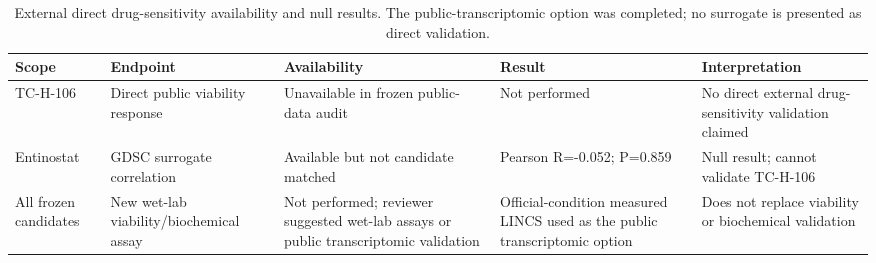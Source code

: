 \begingroup
\footnotesize
\begin{table}[H]
\centering
\caption{External direct drug-sensitivity availability and null results. The public-transcriptomic option was completed; no surrogate is presented as direct validation.}
\label{tab:s_external}
\begin{tabular}{@{}p{}p{}p{}p{}p{}@{}}
\toprule
Scope & Endpoint & Availability & Result & Interpretation \\
\midrule
TC-H-106 & Direct public viability response & Unavailable in frozen public-data audit & Not performed & No direct external drug-sensitivity validation claimed \\
Entinostat & GDSC surrogate correlation & Available but not candidate matched & Pearson R=-0.052; P=0.859 & Null result; cannot validate TC-H-106 \\
All frozen candidates & New wet-lab viability/biochemical assay & Not performed; reviewer suggested wet-lab assays or public transcriptomic validation & Official-condition measured LINCS used as the public transcriptomic option & Does not replace viability or biochemical validation \\
\bottomrule
\end{tabular}
\end{table}
\endgroup
